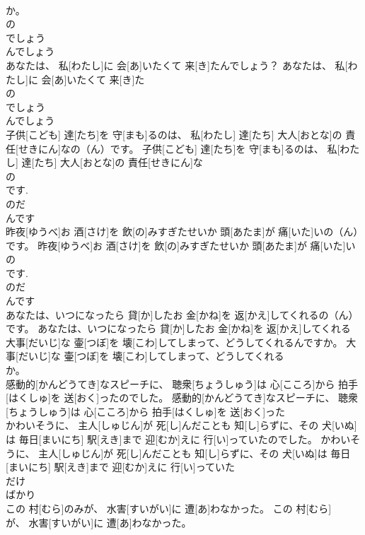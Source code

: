\documentclass[8pt]{extreport}
\begin{document}
\begin{CJK}{UTF8}{min}
\\	か。	
\\	の 
\\	でしょう 
\\	んでしょう
\\	あなたは、 私[わたし]に 会[あ]いたくて 来[き]たんでしょう？	あなたは、 私[わたし]に 会[あ]いたくて 来[き]た
\\	の 
\\	でしょう 
\\	んでしょう
\\	子供[こども] 達[たち]を 守[まも]るのは、 私[わたし] 達[たち] 大人[おとな]の 責任[せきにん]なの（ん）です。	子供[こども] 達[たち]を 守[まも]るのは、 私[わたし] 達[たち] 大人[おとな]の 責任[せきにん]な
\\	の 
\\	です. 
\\	のだ 
\\	んです
\\	昨夜[ゆうべ]お 酒[さけ]を 飲[の]みすぎたせいか 頭[あたま]が 痛[いた]いの（ん）です。	昨夜[ゆうべ]お 酒[さけ]を 飲[の]みすぎたせいか 頭[あたま]が 痛[いた]い
\\	の 
\\	です. 
\\	のだ 
\\	んです
\\	あなたは、いつになったら 貸[か]したお 金[かね]を 返[かえ]してくれるの（ん）です。	あなたは、いつになったら 貸[か]したお 金[かね]を 返[かえ]してくれる
\\	大事[だいじ]な 壷[つぼ]を 壊[こわ]してしまって、どうしてくれるんですか。	大事[だいじ]な 壷[つぼ]を 壊[こわ]してしまって、どうしてくれる
\\	か。	
\\	感動的[かんどうてき]なスピーチに、 聴衆[ちょうしゅう]は 心[こころ]から 拍手[はくしゅ]を 送[おく]ったのでした。	感動的[かんどうてき]なスピーチに、 聴衆[ちょうしゅう]は 心[こころ]から 拍手[はくしゅ]を 送[おく]った
\\	かわいそうに、 主人[しゅじん]が 死[し]んだことも 知[し]らずに、その 犬[いぬ]は 毎日[まいにち] 駅[えき]まで 迎[むか]えに 行[い]っていたのでした。	かわいそうに、 主人[しゅじん]が 死[し]んだことも 知[し]らずに、その 犬[いぬ]は 毎日[まいにち] 駅[えき]まで 迎[むか]えに 行[い]っていた
\\	だけ 
\\	ばかり 
\\	この 村[むら]のみが、 水害[すいがい]に 遭[あ]わなかった。	この 村[むら]
\\	が、 水害[すいがい]に 遭[あ]わなかった。	

\end{CJK}
\end{document}
